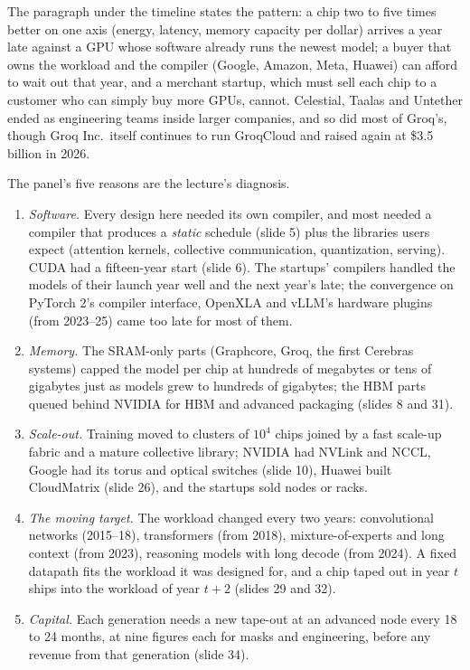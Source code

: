 \documentclass[11pt,letterpaper]{article}
\begin{document}
The paragraph under the timeline states the pattern: a chip two to five times better on one axis (energy, latency, memory capacity per dollar) arrives a year late against a GPU whose software already runs the newest model; a buyer that owns the workload and the compiler (Google, Amazon, Meta, Huawei) can afford to wait out that year, and a merchant startup, which must sell each chip to a customer who can simply buy more GPUs, cannot. Celestial, Taalas and Untether ended as engineering teams inside larger companies, and so did most of Groq's, though Groq Inc.\ itself continues to run GroqCloud and raised again at \$3.5 billion in 2026.

The panel's five reasons are the lecture's diagnosis.
\begin{enumerate}
\item \emph{Software.} Every design here needed its own compiler, and most needed a compiler that produces a \emph{static} schedule (slide 5) plus the libraries users expect (attention kernels, collective communication, quantization, serving). CUDA had a fifteen-year start (slide 6). The startups' compilers handled the models of their launch year well and the next year's late; the convergence on PyTorch 2's compiler interface, OpenXLA and vLLM's hardware plugins (from 2023--25) came too late for most of them.
\item \emph{Memory.} The SRAM-only parts (Graphcore, Groq, the first Cerebras systems) capped the model per chip at hundreds of megabytes or tens of gigabytes just as models grew to hundreds of gigabytes; the HBM parts queued behind NVIDIA for HBM and advanced packaging (slides 8 and 31).
\item \emph{Scale-out.} Training moved to clusters of $10^4$ chips joined by a fast scale-up fabric and a mature collective library; NVIDIA had NVLink and NCCL, Google had its torus and optical switches (slide 10), Huawei built CloudMatrix (slide 26), and the startups sold nodes or racks.
\item \emph{The moving target.} The workload changed every two years: convolutional networks (2015--18), transformers (from 2018), mixture-of-experts and long context (from 2023), reasoning models with long decode (from 2024). A fixed datapath fits the workload it was designed for, and a chip taped out in year $t$ ships into the workload of year $t+2$ (slides 29 and 32).
\item \emph{Capital.} Each generation needs a new tape-out at an advanced node every 18 to 24 months, at nine figures each for masks and engineering, before any revenue from that generation (slide 34).
\end{enumerate}
\end{document}
